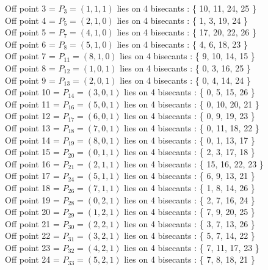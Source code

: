 \documentclass{article}
\begin{document}
{Off point 3 = $P_{3} = ( 1, 1, 1 )$ lies on 4 bisecants : \{ 10, 11, 24, 25 \}\\
Off point 4 = $P_{5} = ( 2, 1, 0 )$ lies on 4 bisecants : \{ 1, 3, 19, 24 \}\\
Off point 5 = $P_{7} = ( 4, 1, 0 )$ lies on 4 bisecants : \{ 17, 20, 22, 26 \}\\
Off point 6 = $P_{8} = ( 5, 1, 0 )$ lies on 4 bisecants : \{ 4, 6, 18, 23 \}\\
Off point 7 = $P_{11} = ( 8, 1, 0 )$ lies on 4 bisecants : \{ 9, 10, 14, 15 \}\\
Off point 8 = $P_{12} = ( 1, 0, 1 )$ lies on 4 bisecants : \{ 0, 3, 16, 25 \}\\
Off point 9 = $P_{13} = ( 2, 0, 1 )$ lies on 4 bisecants : \{ 0, 4, 14, 24 \}\\
Off point 10 = $P_{14} = ( 3, 0, 1 )$ lies on 4 bisecants : \{ 0, 5, 15, 26 \}\\
Off point 11 = $P_{16} = ( 5, 0, 1 )$ lies on 4 bisecants : \{ 0, 10, 20, 21 \}\\
Off point 12 = $P_{17} = ( 6, 0, 1 )$ lies on 4 bisecants : \{ 0, 9, 19, 23 \}\\
Off point 13 = $P_{18} = ( 7, 0, 1 )$ lies on 4 bisecants : \{ 0, 11, 18, 22 \}\\
Off point 14 = $P_{19} = ( 8, 0, 1 )$ lies on 4 bisecants : \{ 0, 1, 13, 17 \}\\
Off point 15 = $P_{20} = ( 0, 1, 1 )$ lies on 4 bisecants : \{ 2, 3, 17, 18 \}\\
Off point 16 = $P_{21} = ( 2, 1, 1 )$ lies on 4 bisecants : \{ 15, 16, 22, 23 \}\\
Off point 17 = $P_{24} = ( 5, 1, 1 )$ lies on 4 bisecants : \{ 6, 9, 13, 21 \}\\
Off point 18 = $P_{26} = ( 7, 1, 1 )$ lies on 4 bisecants : \{ 1, 8, 14, 26 \}\\
Off point 19 = $P_{28} = ( 0, 2, 1 )$ lies on 4 bisecants : \{ 2, 7, 16, 24 \}\\
Off point 20 = $P_{29} = ( 1, 2, 1 )$ lies on 4 bisecants : \{ 7, 9, 20, 25 \}\\
Off point 21 = $P_{30} = ( 2, 2, 1 )$ lies on 4 bisecants : \{ 3, 7, 13, 26 \}\\
Off point 22 = $P_{31} = ( 3, 2, 1 )$ lies on 4 bisecants : \{ 5, 7, 14, 22 \}\\
Off point 23 = $P_{32} = ( 4, 2, 1 )$ lies on 4 bisecants : \{ 7, 11, 17, 23 \}\\
Off point 24 = $P_{33} = ( 5, 2, 1 )$ lies on 4 bisecants : \{ 7, 8, 18, 21 \}\\
}
\end{document}
